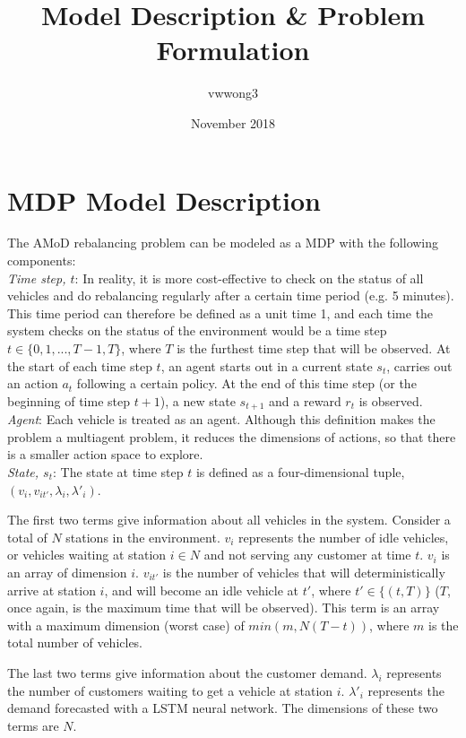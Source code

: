 \documentclass{article}
\title{Model Description & Problem Formulation}
\author{vwwong3 }
\date{November 2018}
\begin{document}
\maketitle

\section{MDP Model Description}
The AMoD rebalancing problem can be modeled as a MDP with the following components: \\

\noindent \textit{Time step, $t$}: In reality, it is more cost-effective to check on the status of all vehicles and do rebalancing regularly after a certain time period (e.g. 5 minutes). This time period can therefore be defined as a unit time 1, and each time the system checks on the status of the environment would be a time step $t \in \{0,1,...,T-1,T\}$, where $T$ is the furthest time step that will be observed. At the start of each time step $t$, an agent starts out in a current state $s_t$, carries out an action $a_t$ following a certain policy. At the end of this time step (or the beginning of time step $t+1$), a new state $s_{t+1}$ and a reward $r_t$ is observed.\\

\noindent \textit{Agent}: Each vehicle is treated as an agent. Although this definition makes the problem a multiagent problem, it reduces the dimensions of actions, so that there is a smaller action space to explore. \\

\noindent \textit{State, $s_t$}: The state at time step $t$ is defined as a four-dimensional tuple, $(v_i,v_{it'},\lambda_i,\lambda'_i)$.

The first two terms give information about all vehicles in the system. Consider a total of $N$ stations in the environment. $v_i$ represents the number of idle vehicles, or vehicles waiting at station $i\in N$ and not serving any customer at time $t$. $v_i$ is an array of dimension $i$. $v_{it'}$ is the number of vehicles that will deterministically arrive at station $i$, and will become an idle vehicle at $t'$, where $t'\in \{(t,T)\}$ ($T$, once again, is the maximum time that will be observed). This term is an array with a maximum dimension (worst case) of $min(m,N(T-t))$, where $m$ is the total number of vehicles.

The last two terms give information about the customer demand. $\lambda_i$ represents the number of customers waiting to get a vehicle at station $i$. $\lambda'_i$ represents the demand forecasted with a LSTM neural network. The dimensions of these two terms are $N$.
\end{document}
